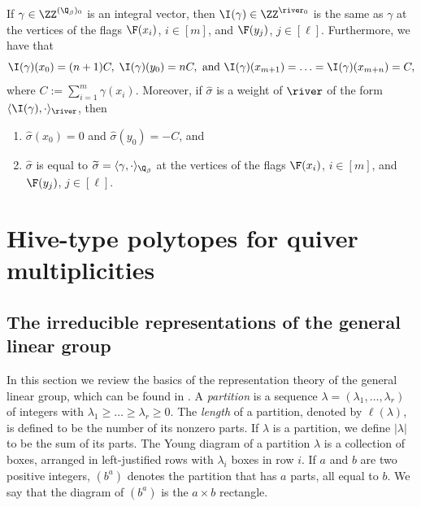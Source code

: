 \begin{rema} \label{dim-wts-river-quiver-rmk} If $\gamma \in \ZZ^{(\Q_{\beta})_0}$ is an integral vector,  then $\I(\gamma) \in \ZZ^{\river_0}$ is the same as $\gamma$ at the vertices of the flags $\F(x_i)$, $i \in [m]$, and $\F(y_j)$, $j \in [\ell]$. Furthermore, we have that
$$
\I(\gamma)(x_0)=(n+1)C, \; \I(\gamma)(y_0)=nC, \text{~and~}\I(\gamma)(x_{m+1})=\ldots=\I(\gamma)(x_{m+n})=C,
$$
where $C:=\sum_{i=1}^m \gamma(x_i)$. Moreover, if $\widehat{\sigma}$ is a weight of $\river$ of the form $\langle \I(\gamma), \cdot \rangle_{\river}$, then 
\begin{enumerate}
\item $\widehat{\sigma}(x_0)=0$ and $\widehat{\sigma}(y_0)=-C$, and
\item $\widehat{\sigma}$ is equal to $\widetilde{\sigma}=\langle \gamma, \cdot \rangle_{\Q_\beta}$ at the vertices of the flags $\F(x_i)$, $i \in [m]$, and $\F(y_j)$, $j \in [\ell]$.
\end{enumerate}
\end{rema}

\section{Hive-type polytopes for quiver multiplicities}\label{Hive-poly-semi-inv-sec}

\subsection{The irreducible representations of the general linear group} In this section we review the basics of the representation theory of the general linear group, which can be found in \cite{F3}. A \emph{partition} is a sequence $\lambda = (\lambda_1,\ldots, \lambda_r)$ of integers with $\lambda_1 \geq \ldots \geq \lambda_r \geq 0$. The \emph{length} of a partition, denoted by $\ell(\lambda)$, is defined to be the number of its nonzero parts. If $\lambda$ is a partition, we define $|\lambda|$ to be the sum of its parts. The Young diagram of a partition $\lambda$ is a collection of boxes, arranged in left-justified rows with $\lambda_i$ boxes in row $i$. If $a$ and $b$ are two positive integers, $(b^a)$ denotes the partition that has $a$ parts, all equal to $b$. We say that the diagram of $(b^a)$ is the $a \times b$ rectangle.

